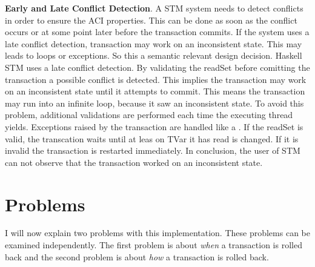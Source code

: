 \textbf{Early and Late Conflict Detection}. A STM system needs to detect conflicts in order to ensure the ACI properties. This can 
be done as soon as the conflict occurs or at some point later before the transaction commits. If the system uses a late conflict 
detection, transaction may work on an inconsistent state. This may leads to loops or exceptions. So this a semantic relevant design 
decision. Haskell STM uses a late conflict detection. By validating the readSet before comitting the transaction a possible conflict
is detected. This implies the transaction may work on an inconsistent state until it attempts to commit. This means the transaction 
may run into an infinite loop, because it saw an inconsistent state. To avoid this problem, additional validations are performed
each time the executing thread yields. Exceptions raised by the transaction are handled like a . If the readSet is valid,
the transcation waits until at leas on TVar it has read is changed. If it is invalid the transaction is restarted immediately.
In conclusion, the user of STM can not observe that the transaction worked on an inconsistent state.

\section{Problems}
I will now explain two problems with this implementation. These problems can be examined independently. The first problem is about
\textit{when} a transaction is rolled back and the second problem is about \textit{how} a transaction is rolled back.

